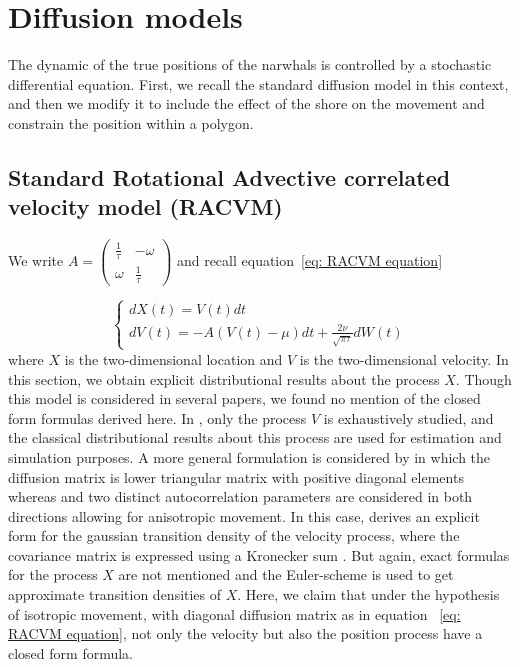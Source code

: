 \documentclass[11pt]{article}
\newcommand {\1}{\mathbb{1}}
\begin{document}
\section{Diffusion models}

The dynamic of the true positions of the narwhals is controlled by a stochastic differential equation. First, we recall the standard diffusion model in this context, and then we modify it to include the effect of the shore on the movement and constrain the position within a polygon.


\subsection{Standard Rotational Advective correlated velocity model (RACVM)}
\label{section: RACVM}


We write $A=\begin{pmatrix} 
	\frac{1}{\tau} & -\omega \\
	\omega & \frac{1}{\tau}
\end{pmatrix}$ and recall equation~\ref{eq: RACVM equation}

\begin{equation*} \left\{
	\begin{array}{l}
		dX(t)=V(t)dt \\
		dV(t)=-A(V(t)-\mu)dt+\frac{2\nu}{\sqrt{\pi \tau}} dW(t) 
	\end{array}
	\right.
	\label{eq: RACVM equation bis}
\end{equation*}
where $X$ is the two-dimensional location and $V$ is the two-dimensional velocity.
In this section, we obtain explicit distributional results about the process $X$. Though this model is considered in several papers, we found no mention of the closed form formulas derived here. In \cite{gurarie_correlated_2017}, only the process $V$ is exhaustively studied, and the classical distributional results about this process are used for estimation and simulation purposes.
A more general formulation is considered by \cite{albertsen_generalizing_2018} in which the diffusion matrix is lower triangular matrix with positive diagonal elements whereas and two distinct autocorrelation parameters are considered in both directions allowing for anisotropic movement.
In this case, \cite{albertsen_generalizing_2018} derives an explicit form for the gaussian transition density of the velocity process, where the covariance matrix is expressed using a Kronecker sum \cite{albertsen_generalizing_2018}. But again, exact formulas for the process $X$ are not mentioned and the Euler-scheme is used to get approximate transition densities of $X$. Here, we claim that under the hypothesis of isotropic movement, with diagonal diffusion matrix as in equation ~\ref{eq: RACVM equation}, not only the velocity but also the position process have a closed form formula. \\
\end{document}
